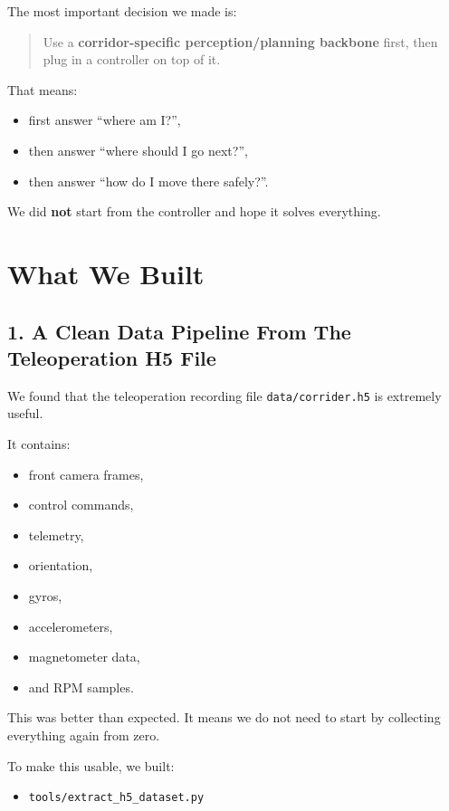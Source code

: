 \documentclass[11pt,a4paper]{article}
\begin{document}
The most important decision we made is:

\begin{quote}
Use a \textbf{corridor-specific perception/planning backbone} first, then plug
in a controller on top of it.
\end{quote}

That means:

\begin{itemize}[nosep]
  \item first answer ``where am I?'',
  \item then answer ``where should I go next?'',
  \item then answer ``how do I move there safely?''.
\end{itemize}

We did \textbf{not} start from the controller and hope it solves everything.


\section{What We Built}

\subsection{1. A Clean Data Pipeline From The Teleoperation H5 File}

We found that the teleoperation recording file
\texttt{data/corrider.h5} is extremely useful.

It contains:

\begin{itemize}[nosep]
  \item front camera frames,
  \item control commands,
  \item telemetry,
  \item orientation,
  \item gyros,
  \item accelerometers,
  \item magnetometer data,
  \item and RPM samples.
\end{itemize}

This was better than expected.  It means we do not need to start by collecting
everything again from zero.

To make this usable, we built:

\begin{itemize}[nosep]
  \item \texttt{tools/extract\_h5\_dataset.py}
\end{itemize}
\end{document}
